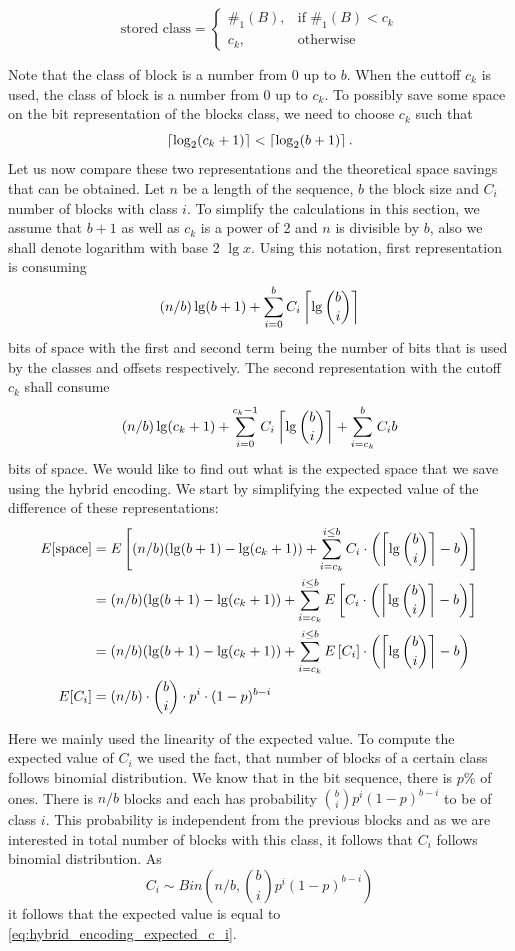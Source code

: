 \[
    \text{stored class} = 
\begin{cases}
    \#_1(B),& \text{if } \#_1(B) < c_k\\
    c_k,              & \text{otherwise}
\end{cases}
\]

Note that the class of block is a number from 0 up to $b$. When the cuttoff $c_k$ is
used, the class of block is a number from 0 up to $c_k$. To possibly save some space on the bit representation
of the blocks class, we need to choose $c_k$ such that $$\left\lceil \log_2(c_k+1) \right\rceil < \left\lceil \log_2(b+1) \right\rceil.$$
Let us now compare these two representations and the theoretical space savings that
can be obtained. Let $n$ be a length of the sequence, $b$ the block size and $C_i$
number of blocks with class $i$. To simplify the calculations in this section, we
assume that $b+1$ as well as $c_k$ is a power of 2 and $n$ is divisible by $b$, also
we shall denote logarithm with base 2 $\lg x$. Using this notation, first representation
is consuming $$(n/b)\lg (b+1) + \sum_{i=0}^{b} C_i\left\lceil \lg {b\choose i} \right\rceil$$
bits of space with the first and second term being the number of bits that
is used by the classes and offsets respectively. The second representation
with the cutoff $c_k$ shall consume $$(n/b)\lg (c_k+1) + \sum_{i=0}^{c_k-1}C_i\left\lceil \lg {b\choose i} \right\rceil + \sum_{i=c_k}^{b}C_i b$$
bits of space. We would like to find out what is the expected space that we save
using the hybrid encoding. We start by simplifying the expected value of the
difference of these representations:
\begin{align}
E[\text{space}] &= E\left[(n/b)(\lg(b+1)-\lg(c_k+1)) + \sum_{i=c_k}^{i\leq b}C_i\cdot \left(\left\lceil \lg{b\choose i} \right\rceil - b\right)\right] \nonumber\\
&=(n/b)(\lg(b+1)-\lg(c_k+1)) + \sum_{i=c_k}^{i\leq b}E\left[C_i\cdot \left(\left\lceil \lg{b\choose i} \right\rceil - b\right)\right] \nonumber\\
&=(n/b)(\lg(b+1)-\lg(c_k+1)) + \sum_{i=c_k}^{i\leq b}E\left[C_i\right]\cdot \left(\left\lceil \lg{b\choose i} \right\rceil - b\right) \nonumber\\
E[C_i] &= (n/b)\cdot {b\choose i}\cdot p^i\cdot (1-p)^{b-i} \label{eq:hybrid_encoding_expected_c_i}
\end{align}

Here we mainly used the linearity of the expected value. To compute the expected value of
$C_i$ we used the fact, that number of blocks of a certain class follows binomial
distribution. We know that in the bit sequence, there is $p\%$ of ones. There is $n/b$ blocks
and each has probability ${b\choose i}p^i(1-p)^{b-i}$ to be of class $i$. This probability
is independent from the previous blocks and as we are interested in total number of blocks with
this class, it follows that $C_i$ follows binomial distribution. As
$$C_i \sim Bin\left(n/b, {b\choose i}p^i(1-p)^{b-i}\right)$$ it follows that the expected value is equal to
\ref{eq:hybrid_encoding_expected_c_i}.

